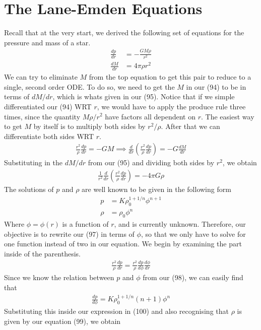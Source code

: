 \documentclass{article}
\begin{document}
\section*{The Lane-Emden Equations}
Recall that at the very start, we derived the following set of equations for the pressure 
and mass of a star. 
\begin{align}
    \frac{dp}{dr}&=-\frac{GM\rho}{r^2}\\
    \frac{dM}{dr}&=4\pi\rho r^2
\end{align}
We can try to eliminate $M$ from the top equation to get this pair to reduce to a single, 
second order ODE. To do so, we need to get the $M$ in our (94) to be in terms of $dM/dr$, 
which is whats given in our (95). Notice that if we simple differentiated our (94) WRT $r$, we would have to apply the 
produce rule three times, since the quantity $M\rho/r^2$ have factors all dependent on $r$. The 
easiest way to get $M$ by itself is to multiply both sides by $r^2/\rho$. After that we can differentiate 
both sides WRT $r$. 
\begin{align}
    \frac{r^2}{\rho}\frac{dp}{dr}=-GM\implies \frac{d}{dr} 
    (\frac{r^2}{\rho}\frac{dp}{dr} ) =-G\frac{dM}{dr}
\end{align} 
Substituting in the $dM/dr$ from our (95) and dividing both sides by $r^2$, we obtain 
\begin{align}
    \boxed{\frac{1}{r^2}\frac{d}{dr}(\frac{r^2}{\rho}\frac{dp}{dr})=-4\pi G\rho}
\end{align}
The solutions of $p$ and $\rho$ are well known to be given in the following form 
\begin{align}
    p&=K\rho_0^{1+1/n}\phi^{n+1} \\
    \rho&=\rho_0\phi^n
\end{align}
Where $\phi=\phi(r)$ is a function of $r$, and is currently unknown. Therefore, our objective 
is to rewrite our (97) in terms of $\phi$, so that we only have to solve for one function instead of two in our equation.
We begin by examining the part inside of the parenthesis. 
\begin{align}
    \frac{r^2}{\rho}\frac{dp}{dr}=\frac{r^2}{\rho}\frac{dp}{d\phi}\frac{d\phi}{dr}
\end{align}
Since we know the relation between $p$ and $\phi$ from our (98), we can easily find that 
\begin{align}
    \frac{dp}{d\phi}=K\rho_0^{1+1/n}(n+1)\phi^n
\end{align}
Substituting this inside our expression in (100) and also recognising that $\rho$ is given by our equation (99), we obtain 
\end{document}
